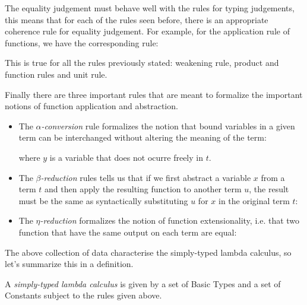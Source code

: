 The equality judgement must behave well with the rules for typing judgements, this means that for each of the rules seen before, there is an appropriate coherence rule for equality judgement. For example, for the application rule of functions, we have the corresponding rule:
\begin{prooftree}
\end{prooftree}
This is true for all the rules previously stated: weakening rule, product and function rules and unit rule.

Finally there are three important rules that are meant to formalize the important notions of function application and abstraction.
\begin{itemize}
\item The \emph{$\alpha$-conversion} rule formalizes the notion that bound variables in a given term can be interchanged without altering the meaning of the term:
\begin{prooftree}
\end{prooftree}
where $y$ is a variable that does not ocurre freely in $t$.

\item The \emph{$\beta$-reduction} rules tells us that if we first abstract a variable $x$ from a term $t$ and then apply the resulting function to another term $u$, the result must be the same as syntactically substituting $u$ for $x$ in the original term $t$:
\begin{prooftree}
\end{prooftree}

\item The \emph{$\eta$-reduction} formalizes the notion of function extensionality, i.e. that two function that have the same output on each term are equal:

\begin{prooftree}
\end{prooftree}
\end{itemize}

The above collection of data characterise the simply-typed lambda calculus, so let's summarize this in a definition.
\begin{defn}
A \emph{simply-typed lambda calculus} is given by a set of Basic Types and a set of Constants subject to the rules given above. 
\end{defn}

\nocite{*}




